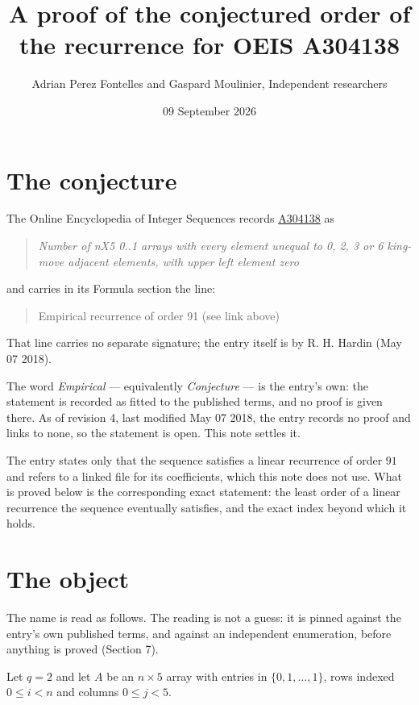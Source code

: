 \documentclass[11pt]{article}
\title{A proof of the conjectured order of the recurrence for OEIS A304138}
\author{Adrian Perez Fontelles and Gaspard Moulinier, Independent researchers}
\date{09 September 2026}
\theoremstyle{definition}
\begin{document}
\maketitle
\section{The conjecture}

The Online Encyclopedia of Integer Sequences records \href{https://oeis.org/A304138}{A304138} as

\begin{quote}\itshape Number of nX5 0..1 arrays with every element unequal to 0, 2, 3 or 6 king-move adjacent elements, with upper left element zero\end{quote}

and carries in its Formula section the line:

\begin{quote}\ttfamily Empirical recurrence of order 91 (see link above)\end{quote}

That line carries no separate signature; the entry itself is by R. H. Hardin (May 07 2018).

The word {\itshape Empirical} --- equivalently {\itshape Conjecture} --- is the entry's own: the statement is recorded as fitted to the published terms, and no proof is given there. As of revision 4, last modified May 07 2018, the entry records no proof and links to none, so the statement is open. This note settles it.

The entry states only that the sequence satisfies a linear recurrence of order $91$ and refers to a linked file for its coefficients, which this note does not use. What is proved below is the corresponding exact statement: the least order of a linear recurrence the sequence eventually satisfies, and the exact index beyond which it holds.

\section{The object}

The name is read as follows. The reading is not a guess: it is pinned against the entry's own published terms, and against an independent enumeration, before anything is proved (Section 7).

Let $q = 2$ and let $A$ be an $n \times 5$ array with entries in $\{0,1,\dots,1\}$, rows indexed $0 \le i < n$ and columns $0 \le j < 5$.
\end{document}
